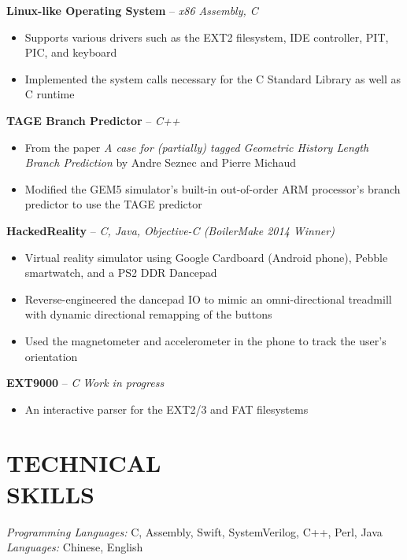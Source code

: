 \documentclass[resmargin]{res}
\begin{document}
\begin{resume}
\vspace{-3mm}
{\bf Linux-like Operating System} -- {\sl x86 Assembly, C} 
\begin{itemize} \itemsep -1pt
    \item Supports various drivers such as the EXT2 filesystem, IDE controller, PIT, PIC, and keyboard
    \item Implemented the system calls necessary for the C Standard Library as well as C runtime
\end{itemize}

\vspace{-3mm}
{\bf TAGE Branch Predictor} -- {\sl C++} 
\begin{itemize} \itemsep -1pt
    \item From the paper {\sl A case for (partially) tagged Geometric History Length Branch Prediction} by Andre Seznec and Pierre Michaud
    \item Modified the GEM5 simulator's built-in out-of-order ARM processor's branch predictor to use the TAGE predictor
\end{itemize}

\vspace{-3mm}
{\bf HackedReality} -- {\sl C, Java, Objective-C \hfill(BoilerMake 2014 Winner)}
\begin{itemize} \itemsep -1pt
    \item Virtual reality simulator using Google Cardboard (Android phone), Pebble smartwatch, and a PS2 DDR Dancepad
    \item Reverse-engineered the dancepad IO to mimic an omni-directional treadmill with dynamic directional remapping of the buttons
    \item Used the magnetometer and accelerometer in the phone to track the user's orientation
\end{itemize}

\vspace{-3mm}
{\bf EXT9000} -- {\sl C} \hfill {\sl Work in progress}
\begin{itemize} \itemsep -1pt
    \item An interactive parser for the EXT2/3 and FAT filesystems
\end{itemize}

\vspace{-3mm}
\section{TECHNICAL \\ SKILLS} 
{\sl Programming Languages:} C, Assembly, Swift, SystemVerilog, C++, Perl, Java\\
{\sl Languages:} Chinese, English

\end{resume}
\end{document}

